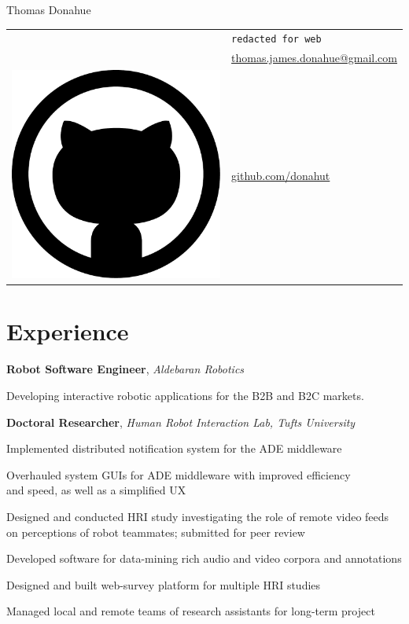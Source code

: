 \documentclass[10pt, letter]{article}
\newcommand*\github{\includegraphics[height=2ex]{github.pdf}}
\newcommand{\years}[1]{\marginnote{\footnotesize #1}}
\newenvironment{itemize*}{
  \begin{itemize}
    \setlength{\itemsep}{0pt}
    \setlength{\parskip}{-1pt}
    \setlength{\parsep}{-1pt}
  }{
  \end{itemize}
}
\begin{document}
\begin{minipage}[t]{0.55\textwidth}
  {\huge Thomas Donahue}
\end{minipage}
\begin{minipage}[t]{0.4\textwidth}
  \begin{tabular}[h]{ll}
    \Phone{}    & \texttt{redacted for web}\\
    \Envelope{} & \href{mailto:thomas.james.donahue@gmail.com}{thomas.james.donahue@gmail.com}\\    
    \github{}   & \href{http://www.github.com/donahut}{github.com/donahut}
  \end{tabular}
\end{minipage}

\section*{Experience}
\years{Mar 2014--}
\textbf{Robot Software Engineer}, \textsl{Aldebaran Robotics}
\begin{itemize*}
\item Developing interactive robotic applications for the B2B and B2C
  markets.
\end{itemize*}

\years{2012--2014}
\textbf{Doctoral Researcher}, \textsl{Human Robot Interaction Lab,
  Tufts University}
\begin{itemize*}
\item Implemented distributed notification system for the ADE middleware
\item Overhauled system GUIs for ADE middleware with improved
  efficiency\\ and speed, as well as a simplified UX 
\item Designed and conducted HRI study investigating the role of
  remote video feeds\\ on perceptions of robot teammates; submitted
  for peer review 
\item Developed software for data-mining rich audio and video corpora
  and annotations
\item Designed and built web-survey platform for multiple HRI studies
\item Managed local and remote teams of research
  assistants for long-term project
\end{itemize*}
\end{document}
